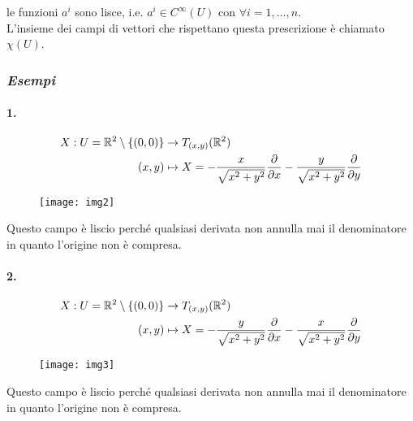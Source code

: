 le funzioni $ a^{i} $ sono lisce, i.e. $ a^{i} \in C^{\infty}(U) $ con $ \forall i=1,\dots,n $.\\
L'insieme dei campi di vettori che rispettano questa prescrizione è chiamato $ \chi(U) $.

\subsubsection{\textit{Esempi}}

\paragraph{1.}

\begin{align}
	\begin{split}
		X : U = \mathbb{R}^{2} \setminus \{(0,0)\} &\to T_{(x,y)}(\mathbb{R}^{2})\\
		(x,y) &\mapsto X = - \dfrac{x}{\sqrt{x^{2}+y^{2}}} \dfrac{\partial}{\partial x} - \dfrac{y}{\sqrt{x^{2}+y^{2}}} \dfrac{\partial}{\partial y}
	\end{split}
\end{align}

\begin{figure}[H]
	\centering
	\texttt{[image: img2]}
\end{figure}

Questo campo è liscio perché qualsiasi derivata non annulla mai il denominatore in quanto l'origine non è compresa.

\paragraph{2.}

\begin{align}
	\begin{split}
		X : U = \mathbb{R}^{2} \setminus \{(0,0)\} &\to T_{(x,y)}(\mathbb{R}^{2})\\
		(x,y) &\mapsto X = - \dfrac{y}{\sqrt{x^{2}+y^{2}}} \dfrac{\partial}{\partial x} - \dfrac{x}{\sqrt{x^{2}+y^{2}}} \dfrac{\partial}{\partial y}
	\end{split}
\end{align}

\begin{figure}[H]
	\centering
	\texttt{[image: img3]}
\end{figure}

Questo campo è liscio perché qualsiasi derivata non annulla mai il denominatore in quanto l'origine non è compresa.

